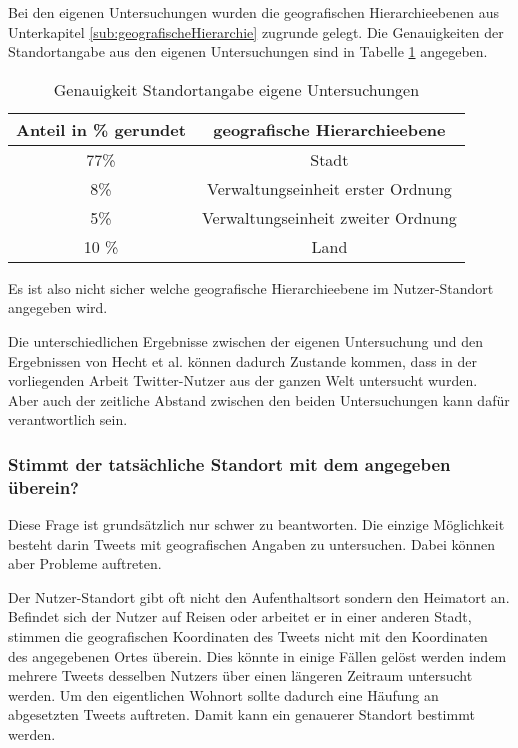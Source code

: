				Bei den eigenen Untersuchungen wurden die geografischen Hierarchieebenen aus Unterkapitel \ref{sub:geografischeHierarchie} zugrunde gelegt.
				Die Genauigkeiten der Standortangabe aus den eigenen Untersuchungen sind in Tabelle \ref{tab:genauigkeitenEigene} angegeben.

				\begin{table}[htpb]
				\caption{Genauigkeit Standortangabe eigene Untersuchungen} 
				\centering
				\begin{tabular}{|c||c|}
					\hline
					Anteil in \% gerundet & geografische Hierarchieebene \\
					\hline\hline
					77\% & Stadt \\
					\hline
					8\% & Verwaltungseinheit erster Ordnung  \\
					\hline
					5\% & Verwaltungseinheit zweiter Ordnung  \\
					\hline
					10 \% & Land \\
					\hline
				\end{tabular}
				\label{tab:genauigkeitenEigene} 
				\end{table} 


				Es ist also nicht sicher welche geografische Hierarchieebene im Nutzer-Standort angegeben wird. 

				Die unterschiedlichen Ergebnisse zwischen der eigenen Untersuchung und den Ergebnissen von Hecht et al. können dadurch Zustande kommen, dass in der vorliegenden Arbeit Twitter-Nutzer aus der ganzen Welt untersucht wurden.
				Aber auch der zeitliche Abstand zwischen den beiden Untersuchungen kann dafür verantwortlich sein.  

			\subsubsection{Stimmt der tatsächliche Standort mit dem angegeben überein?}

				Diese Frage ist grundsätzlich nur schwer zu beantworten.
				Die einzige Möglichkeit besteht darin Tweets mit geografischen Angaben zu untersuchen.
				Dabei können aber Probleme auftreten. 
				
				Der Nutzer-Standort gibt oft nicht den Aufenthaltsort sondern den Heimatort an. 
				Befindet sich der Nutzer auf Reisen oder arbeitet er in einer anderen Stadt, stimmen die geografischen Koordinaten des Tweets nicht mit den Koordinaten des angegebenen Ortes überein.
				Dies könnte in einige Fällen gelöst werden indem mehrere Tweets desselben Nutzers über einen längeren Zeitraum untersucht werden. 
				Um den eigentlichen Wohnort sollte dadurch eine Häufung an abgesetzten Tweets auftreten.
				Damit kann ein genauerer Standort bestimmt werden.

